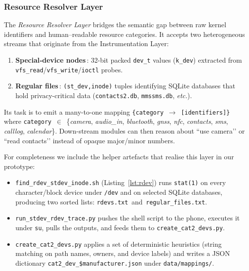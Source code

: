 \documentclass[a4paper,12pt]{report}
\begin{document}
\subsubsection{Resource Resolver Layer}

The \emph{Resource Resolver Layer} bridges the semantic gap between
raw kernel identifiers and human–readable resource categories.  It
accepts two heterogeneous streams that originate from the
Instrumentation Layer:

\begin{enumerate}
  \item \textbf{Special‐device nodes}\,: 32-bit packed
        \texttt{dev\_t} values (\texttt{k\_dev}) extracted from
        \texttt{vfs\_read}/\texttt{vfs\_write}/\texttt{ioctl} probes.
  \item \textbf{Regular files}\,: \texttt{(st\_dev,\;inode)} tuples
        identifying SQLite databases that hold privacy-critical data
        (\texttt{contacts2.db}, \texttt{mmssms.db}, \textit{etc.}).
\end{enumerate}

Its task is to emit a many-to-one mapping
\texttt{\{category $\rightarrow$ [identifiers]\}} where
\texttt{category}~$\in$~\{\textit{camera}, \textit{audio\_in},
\textit{bluetooth}, \textit{gnss}, \textit{nfc},
\textit{contacts}, \textit{sms}, \textit{calllog},
\textit{calendar}\}.
Down-stream modules can then reason about ``use camera’’ or ``read
contacts’’ instead of opaque major/minor numbers.

For completeness we include the helper artefacts that realise this
layer in our prototype:

\begin{itemize}
  \item \texttt{find\_rdev\_stdev\_inode.sh} (Listing~\ref{lst:rdev})
        runs \texttt{stat(1)} on every character/block device under
        \texttt{/dev} and on selected SQLite databases, producing two
        sorted lists:
        \texttt{rdevs.txt}~and~\texttt{regular\_files.txt}.
  \item \texttt{run\_stdev\_rdev\_trace.py} pushes the shell script to
        the phone, executes it under \texttt{su}, pulls the outputs,
        and feeds them to
        \texttt{create\_cat2\_devs.py}.
  \item \texttt{create\_cat2\_devs.py} applies a set of deterministic
        heuristics (string matching on path names, owners, and device
        labels) and writes a JSON dictionary
        \texttt{cat2\_dev\_\$manufacturer.json} under
        \texttt{data/mappings/}.
\end{itemize}
\end{document}

